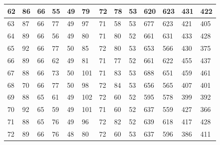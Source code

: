 \documentclass[legalpaper,12pt]{article}
\begin{document}
\begin{table}[h]
\begin{tabular}{|l|l|l|l|l|l|l|l|l|l|l|l|l|}
62                                        & 86         & 66        & 55          & 49         & 79         & 72        & 78          & 53         & 620        & 623       & 431         & 422        \\ \hline
63                                        & 87         & 66        & 77          & 49         & 97         & 71        & 58          & 53         & 677        & 623       & 421         & 405        \\ \hline
64                                        & 89         & 66        & 56          & 49         & 80         & 71        & 80          & 52         & 661        & 631       & 433         & 428        \\ \hline
65                                        & 92         & 66        & 77          & 50         & 85         & 72        & 80          & 53         & 653        & 566       & 430         & 375        \\ \hline
66                                        & 89         & 66        & 62          & 49         & 81         & 71        & 77          & 52         & 661        & 622       & 455         & 437        \\ \hline
67                                        & 88         & 66        & 73          & 50         & 101        & 71        & 83          & 53         & 688        & 651       & 459         & 461        \\ \hline
68                                        & 70         & 66        & 77          & 50         & 98         & 72        & 84          & 53         & 656        & 565       & 407         & 401        \\ \hline
69                                        & 88         & 65        & 61          & 49         & 102        & 72        & 60          & 52         & 595        & 578       & 399         & 392        \\ \hline
70                                        & 92         & 65        & 59          & 49         & 101        & 71        & 60          & 52         & 637        & 559       & 427         & 366        \\ \hline
71                                        & 88         & 65        & 76          & 49         & 96         & 72        & 82          & 52         & 639        & 618       & 417         & 428        \\ \hline
72                                        & 89         & 66        & 76          & 48         & 80         & 72        & 60          & 53         & 637        & 596       & 386         & 411        \\ \hline

\end{tabular}
\end{table}
\end{document}
